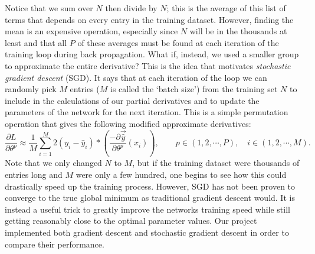 \documentclass[reqno,14pt]{amsart}
\theoremstyle{plain}
\theoremstyle{definition}
\theoremstyle{remark}
\begin{document}
Notice that we sum over $N$ then divide by $N$; this is the average of this list of terms that depends on every entry in the training dataset. However, finding the mean is an expensive operation, especially since $N$ will be in the thousands at least and that all $P$ of these averages must be found at each iteration of the training loop during back propagation. What if, instead, we used a smaller group to approximate the entire derivative? This is the idea that motivates \textit{stochastic gradient descent} (SGD). It says that at each iteration of the loop we can randomly pick $M$ entries ($M$ is called the `batch size') from the training set $N$ to include in the calculations of our partial derivatives and to update the parameters of the network for the next iteration. This is a simple permutation operation that gives the following modified approximate derivatives:
\begin{equation}
    \frac{\partial L}{\partial \theta^p} \approx \frac{1}{M} \sum^M_{i=1} 2 (y_i - \hat{y}_i ) * (\frac{- \partial \overrightarrow{\hat{y}} }{\partial \theta^p} (x_i)), \qquad p \in (1, 2, \cdots, P), \quad i \in (1, 2, \cdots, M).
\end{equation}
Note that we only changed $N$ to $M$, but if the training dataset were thousands of entries long and $M$ were only a few hundred, one begins to see how this could drastically speed up the training process. However, SGD has not been proven to converge to the true global minimum as traditional gradient descent would. It is instead a useful trick to greatly improve the networks training speed while still getting reasonably close to the optimal parameter values. Our project implemented both gradient descent and stochastic gradient descent in order to compare their performance.\\
\end{document}
